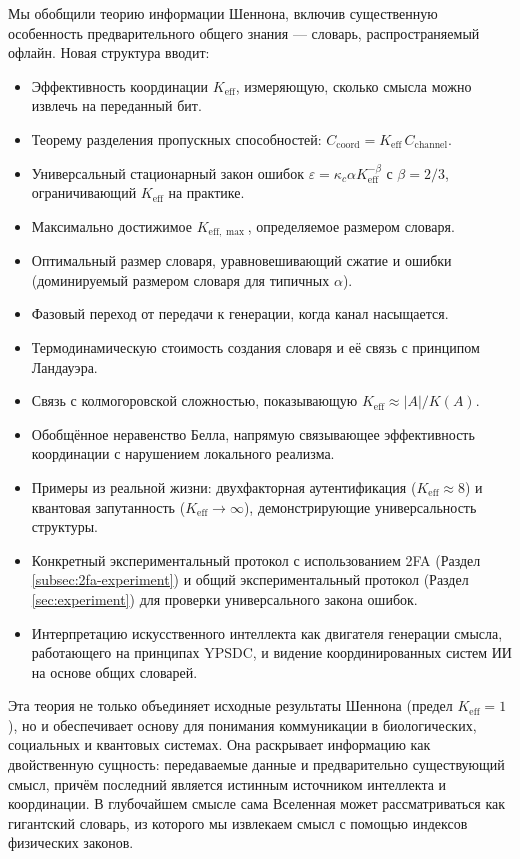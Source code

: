 \documentclass[12pt,a4paper]{article}
\theoremstyle{remark}
\newcommand{\Keff}{K_{\mathrm{eff}}}
\newcommand{\Keffmax}{K_{\mathrm{eff},\max}}
\begin{document}
	Мы обобщили теорию информации Шеннона, включив существенную особенность предварительного общего знания — словарь, распространяемый офлайн. Новая структура вводит:
	\begin{itemize}
		\item Эффективность координации $\Keff$, измеряющую, сколько смысла можно извлечь на переданный бит.
		\item Теорему разделения пропускных способностей: $C_{\text{coord}} = \Keff \, C_{\text{channel}}$.
		\item Универсальный стационарный закон ошибок $\varepsilon = \kappa_c\alpha K_{\mathrm{eff}}^{-\beta}$ с $\beta=2/3$, ограничивающий $\Keff$ на практике.
		\item Максимально достижимое $\Keffmax$, определяемое размером словаря.
		\item Оптимальный размер словаря, уравновешивающий сжатие и ошибки (доминируемый размером словаря для типичных $\alpha$).
		\item Фазовый переход от передачи к генерации, когда канал насыщается.
		\item Термодинамическую стоимость создания словаря и её связь с принципом Ландауэра.
		\item Связь с колмогоровской сложностью, показывающую $\Keff \approx |A|/K(A)$.
		\item Обобщённое неравенство Белла, напрямую связывающее эффективность координации с нарушением локального реализма.
		\item Примеры из реальной жизни: двухфакторная аутентификация ($\Keff \approx 8$) и квантовая запутанность ($\Keff \to \infty$), демонстрирующие универсальность структуры.
		\item Конкретный экспериментальный протокол с использованием 2FA (Раздел \ref{subsec:2fa-experiment}) и общий экспериментальный протокол (Раздел \ref{sec:experiment}) для проверки универсального закона ошибок.
		\item Интерпретацию искусственного интеллекта как двигателя генерации смысла, работающего на принципах YPSDC, и видение координированных систем ИИ на основе общих словарей.
	\end{itemize}
	
	Эта теория не только объединяет исходные результаты Шеннона (предел $\Keff=1$), но и обеспечивает основу для понимания коммуникации в биологических, социальных и квантовых системах. Она раскрывает информацию как двойственную сущность: передаваемые данные и предварительно существующий смысл, причём последний является истинным источником интеллекта и координации. В глубочайшем смысле сама Вселенная может рассматриваться как гигантский словарь, из которого мы извлекаем смысл с помощью индексов физических законов.
	
\end{document}
